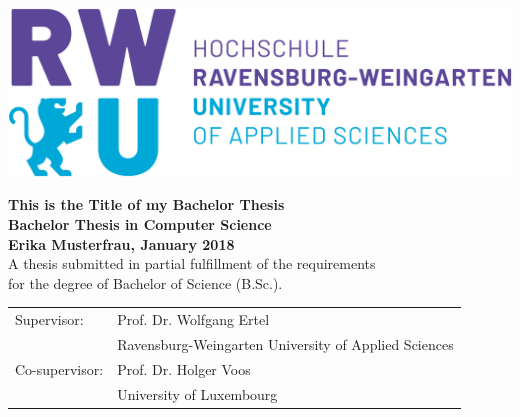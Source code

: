 \pagestyle{empty}



\begin{center}


\vspace*{2cm}
\includegraphics[scale=0.15]{imgs/rwu_logo.png}
\vspace*{3cm}

\huge
\textbf{This is the Title of my Bachelor Thesis}\\
\Large
\vspace*{2cm}
\noindent \textbf{Bachelor Thesis in Computer Science}\\
\vspace*{0.5cm}
\noindent \textbf{Erika Musterfrau, January 2018}\\
\vspace*{2cm}
\normalsize 
A thesis submitted in partial fulfillment of the requirements\\ for the degree
of Bachelor of Science (B.Sc.).
\end{center}

\vspace*{4.5cm}
\begin{tabular}{ll}
Supervisor: & Prof. Dr. Wolfgang Ertel \\
 & Ravensburg-Weingarten University of Applied Sciences\\
Co-supervisor: & Prof. Dr. Holger Voos\\
 & University of Luxembourg\\
\end{tabular}

